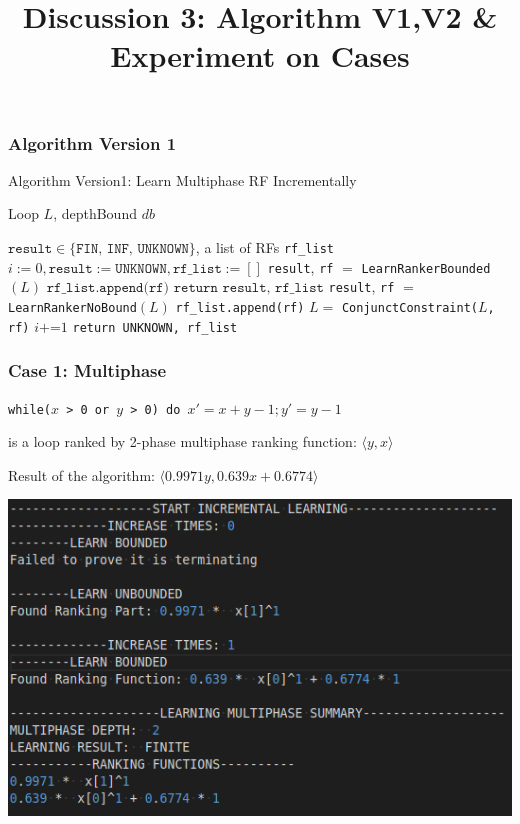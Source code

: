\documentclass[10pt]{beamer}
\title{Discussion 3: Algorithm V1,V2 \& Experiment on Cases}
\begin{document}
\maketitle
\begin{frame}\frametitle{Algorithm Version 1}
\begin{algorithm}[H]
\caption{Algorithm Version1: Learn Multiphase RF Incrementally}
\begin{algorithmic}[1]
\REQUIRE Loop $L$, depthBound $db$

\ENSURE $\texttt{result}\in \{\texttt{FIN, INF, UNKNOWN}\}$, a list of RFs \texttt{rf\_list}
\STATE $i := 0, \texttt{result} := \texttt{UNKNOWN},\texttt{rf\_list} := []$
\STATE \texttt{result}, \texttt{rf} $ = $ \texttt{LearnRankerBounded}$(L)$
\STATE $\texttt{rf\_list.append(rf)}$
\STATE $\texttt{return result, rf\_list}$
\ELSE 
\STATE \texttt{result}, \texttt{rf} $ = $ \texttt{LearnRankerNoBound}$(L)$
\STATE \texttt{rf\_list.append(rf)}
\ENDIF
\STATE $L = $ \texttt{ConjunctConstraint($L$, rf)}
\STATE $i \texttt{+=} 1$
\ENDWHILE
\STATE \texttt{return UNKNOWN, rf\_list}
\end{algorithmic}
\end{algorithm}
\end{frame}


\begin{frame}\frametitle{Case 1: Multiphase}
\begin{example}
\texttt{while($x$ > 0 or $y$ > 0) do }$x' = x + y - 1; y' = y - 1$

is a loop ranked by 2-phase multiphase ranking function: $\langle y, x\rangle$
\end{example}

Result of the algorithm: $\langle 0.9971 y, 0.639x + 0.6774\rangle$

\begin{center}
\includegraphics[scale=0.5]{1.png}
\end{center}

\end{frame}
\end{document}
